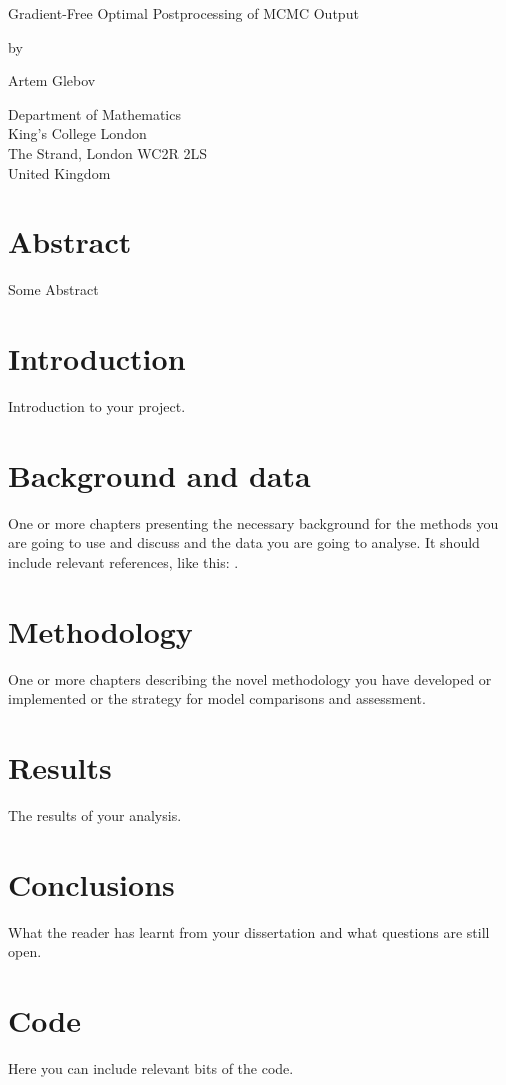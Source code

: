 \documentclass[12pt,a4paper]{report}
\date{}
\begin{document}
\thispagestyle{empty}
\begin{center}
{\huge
Gradient-Free Optimal Postprocessing of MCMC Output

\bigskip
\bigskip

by
\bigskip
\bigskip

Artem Glebov
}
\end{center}
\vfill

\begin{center}
{\large
Department of Mathematics\\
King's College London\\
The Strand, London WC2R 2LS\\
United Kingdom\\
\medskip

}
\end{center}
\bigskip


\newpage
\setcounter{page}{1}

\chapter*{Abstract}
Some Abstract

\tableofcontents


\chapter*{Introduction}
Introduction to your project.

\chapter{Background and data}
One or more chapters presenting the necessary background for the methods you are going to use and discuss and the data you are going to analyse. It should include relevant references, like this: \cite{R}.

\chapter{Methodology}
One or more chapters describing the novel methodology you have developed or implemented or the strategy for model comparisons and assessment. 


\chapter{Results}
The results of your analysis.

\chapter{Conclusions}
What the reader has learnt from your dissertation and what questions are still open.  
\appendix
\chapter{Code}
\label{appendix:code}
 Here you can include relevant bits of the code.




\end{document}

